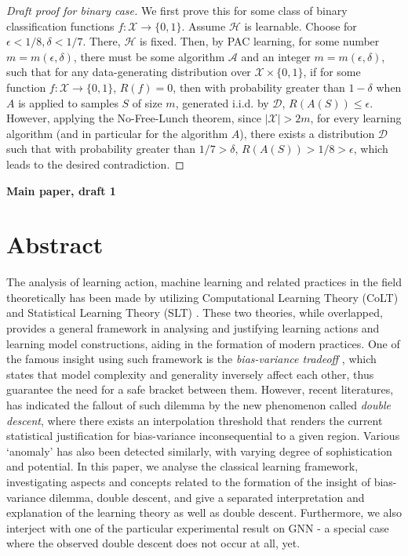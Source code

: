 \begin{proof}[Draft proof for binary case]
    We first prove this for some class of binary classification functions $f: \mathcal{X}\to \{0,1\}$. Assume $\mathcal{H}$ is learnable. Choose for $\epsilon < 1/8, \delta < 1/7$. There, $\mathcal{H}$ is fixed. Then, by PAC learning, for some number $m=m(\epsilon, \delta)$, there must be some algorithm $\mathcal{A}$ and an integer $m = m(\epsilon, \delta)$, such that for any data-generating distribution over $\mathcal{X} \times \{0,1\}$, if for some function $f: \mathcal{X} \to \{0,1\}$, $R(f) = 0$, then with probability greater than $1 - \delta$ when $A$ is applied to samples $S$ of size $m$, generated i.i.d. by $\mathcal{D}$, $R(A(S)) \leq \epsilon$. However, applying the No-Free-Lunch theorem, since $|\mathcal{X}| > 2m$, for every learning algorithm (and in particular for the algorithm $A$), there exists a distribution $\mathcal{D}$ such that with probability greater than $1/7 > \delta$, $R(A(S)) > 1/8 > \epsilon$, which leads to the desired contradiction.
\end{proof}

\clearpage

\begin{center}
    {\Large \bfseries Main paper, draft 1}
\end{center}

\section{Abstract}
The analysis of learning action, machine learning and related practices in the field theoretically has been made by utilizing Computational Learning Theory (CoLT) \cite{10.1145/1968.1972} and Statistical Learning Theory (SLT) \cite{Vapnik1999-VAPTNO}. These two theories, while overlapped, provides a general framework in analysing and justifying learning actions and learning model constructions, aiding in the formation of modern practices. One of the famous insight using such framework is the \textit{bias-variance tradeoff} \cite{6797087}, which states that model complexity and generality inversely affect each other, thus guarantee the need for a safe bracket between them. However, recent literatures, \cite{belkin_reconciling_2019} has indicated the fallout of such dilemma by the new phenomenon called \textit{double descent}, where there exists an interpolation threshold that renders the current statistical justification for bias-variance inconsequential to a given region. Various `anomaly' has also been detected similarly, with varying degree of sophistication and potential. In this paper, we analyse the classical learning framework, investigating aspects and concepts related to the formation of the insight of bias-variance dilemma, double descent, and give a separated interpretation and explanation of the learning theory as well as double descent. Furthermore, we also interject with one of the particular experimental result on GNN - a special case where the observed double descent does not occur at all, yet.

